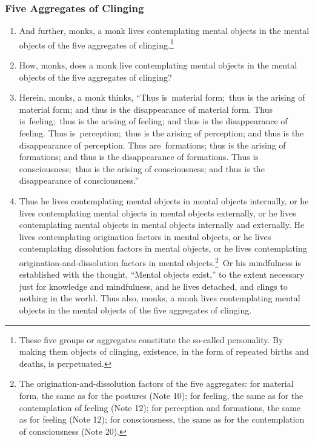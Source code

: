 \documentclass[a4 paper, 12pt]{article}
\begin{document}
\begin{multicols}{2}
\subsubsection*{Five Aggregates of Clinging}
\begin{enumerate}[resume]
\item And further, monks, a monk lives contemplating mental objects in the mental objects of the five aggregates of clinging.\footnote{These five groups or aggregates constitute the so-called personality. By making them objects of clinging, existence, in the form of repeated births and deaths, is perpetuated.}
\item How, monks, does a monk live contemplating mental objects in the mental objects of the five aggregates of clinging?
\item Herein, monks, a monk thinks, “Thus is material form; thus is the arising of material form; and thus is the disappearance of material form. Thus is feeling; thus is the arising of feeling; and thus is the disappearance of feeling. Thus is perception; thus is the arising of perception; and thus is the disappearance of perception. Thus are formations; thus is the arising of formations; and thus is the disappearance of formations. Thus is consciousness; thus is the arising of consciousness; and thus is the disappearance of consciousness.”
\item Thus he lives contemplating mental objects in mental objects internally, or he lives contemplating mental objects in mental objects externally, or he lives contemplating mental objects in mental objects internally and externally. He lives contemplating origination factors in mental objects, or he lives contemplating dissolution factors in mental objects, or he lives contemplating origination-and-dissolution factors in mental objects.\footnote{The origination-and-dissolution factors of the five aggregates: for material form, the same as for the postures (Note 10); for feeling, the same as for the contemplation of feeling (Note 12); for perception and formations, the same as for feeling (Note 12); for consciousness, the same as for the contemplation of consciousness (Note 20).} Or his mindfulness is established with the thought, “Mental objects exist,” to the extent necessary just for knowledge and mindfulness, and he lives detached, and clings to nothing in the world. Thus also, monks, a monk lives contemplating mental objects in the mental objects of the five aggregates of clinging.
\end{enumerate}


\end{multicols}
\end{document}
